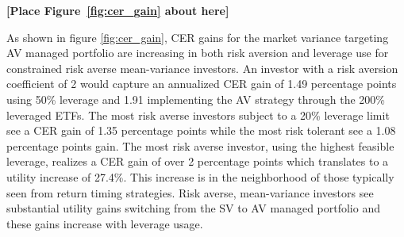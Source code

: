 \bigskip
\centerline{\bf [Place Figure~\ref{fig:cer_gain} about here]}
\bigskip

As shown in figure \ref{fig:cer_gain}, CER gains for the market variance targeting AV managed portfolio are increasing in both risk aversion and leverage use for constrained risk averse mean-variance investors. An investor with a risk aversion coefficient of 2 would capture an annualized CER gain of 1.49 percentage points using 50\% leverage and 1.91 implementing the AV strategy through the 200\% leveraged ETFs. The most risk averse investors subject to a 20\% leverage limit see a CER gain of 1.35 percentage points while the most risk tolerant see a 1.08 percentage points gain. The most risk averse investor, using the highest feasible leverage, realizes a CER gain of over 2 percentage points which translates to a utility increase of 27.4\%. This increase is in the neighborhood of those typically seen from return timing strategies. \citep{campbell1997econometrics,moreira_volatility-managed_2017} Risk averse, mean-variance investors see substantial utility gains switching from the SV to AV managed portfolio and these gains increase with leverage usage.

